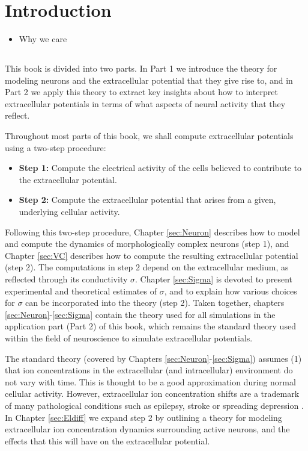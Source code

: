 \section{Introduction} 
\label{sec:Intro}

\begin{itemize}
\item Why we care \citep{Buzsaki2012,Pettersen2012,Einevoll2013,Einevoll2013a,Einevoll2019}
\end{itemize}


\subsection{}
This book is divided into two parts. In Part 1 we introduce the theory for modeling neurons and the extracellular potential that they give rise to, and in Part 2 we apply this theory to extract key insights about how to interpret extracellular potentials in terms of what aspects of neural activity that they reflect.

Throughout most parts of this book, we shall compute extracellular potentials using a two-step procedure:  

\begin{itemize}
\item {\bf Step 1:} Compute the electrical activity of the cells believed to contribute to the extracellular potential. 
\item {\bf Step 2:} Compute the extracellular potential that arises from a given, underlying cellular activity.
\end{itemize}

Following this two-step procedure, Chapter \ref{sec:Neuron} describes how to model and compute the dynamics of morphologically complex neurons (step 1), and Chapter \ref{sec:VC} describes how to compute the resulting extracellular potential (step 2). The computations in step 2 depend on the extracellular medium, as reflected through its conductivity $\sigma$. Chapter \ref{sec:Sigma} is devoted to present experimental and theoretical estimates of $\sigma$, and to explain how various choices for $\sigma$ can be incorporated into the theory (step 2). Taken together, chapters \ref{sec:Neuron}-\ref{sec:Sigma} contain the theory used for all simulations in the application part (Part 2) of this book, which remains the standard theory used within the field of neuroscience to simulate extracellular potentials. 

The standard theory (covered by Chapters \ref{sec:Neuron}-\ref{sec:Sigma}) assumes (1) that ion concentrations in the extracellular (and intracellular) environment do not vary with time. This is thought to be a good approximation during normal cellular activity. However, extracellular ion concentration shifts are a trademark of many pathological conditions such as epilepsy, stroke or spreading depression \citep{Somjen2001, Frohlich2008, Zandt2015review, Ayata2015}. In Chapter \ref{sec:Eldiff} we expand step 2 by outlining a theory for modeling extracellular ion concentration dynamics surrounding active neurons, and the effects that this will have on the extracellular potential. 

